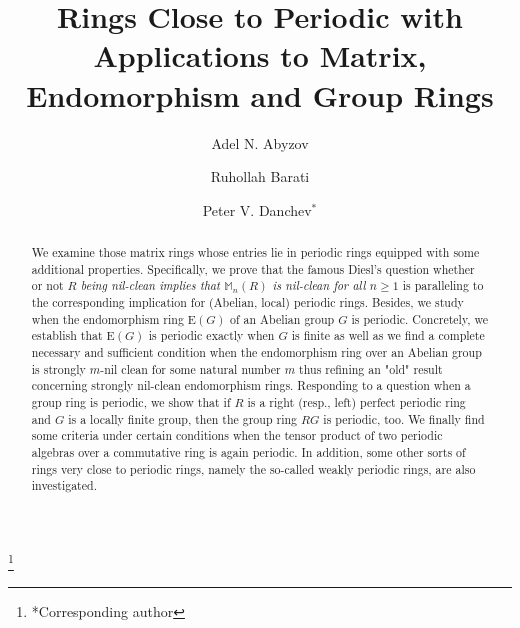 \documentclass[12pt]{amsart}
\theoremstyle{definition}
\theoremstyle{remark}
\numberwithin{equation}{section}
\begin{document}
\author[A.N. Abyzov]{Adel N. Abyzov}
\address{Department of Algebra and Mathematical Logic, Kasan Federal University, Volga Region, Russian Federation}

\author[Ruhollah Barati]{Ruhollah Barati}
\address{Department of Pure Mathematics, Faculty of Mathematical Sciences,
Tarbiat Modares University, Tehran, Iran}

\author[P.V. Danchev]{Peter V. Danchev$^*$}
\address{Institute of Mathematics and Informatics, Bulgarian Academy of Sciences, Sofia, Bulgaria}



\title{Rings Close to Periodic with Applications to Matrix, Endomorphism and Group Rings}
\thanks{*Corresponding author}

\begin{abstract} We examine those matrix rings whose entries lie in periodic rings equipped with some additional properties. Specifically, we prove that the famous Diesl's question whether or not {\it $R$ being nil-clean implies that $\mathbb{M}_n(R)$ is nil-clean for all $n\geq 1$} is paralleling to the corresponding implication for (Abelian, local) periodic rings. Besides, we study when the endomorphism ring $\mathrm{E}(G)$ of an Abelian group $G$ is periodic. Concretely, we establish that $\mathrm{E}(G)$ is periodic exactly when $G$ is finite as well as we find a complete necessary and sufficient condition when the endomorphism ring over an Abelian group is strongly $m$-nil clean for some natural number $m$ thus refining an "old" result concerning strongly nil-clean endomorphism rings. Responding to a question when a group ring is periodic, we show that if $R$ is a right (resp., left) perfect periodic ring and $G$ is a locally finite group, then the group ring $RG$ is periodic, too. We finally find some criteria under certain conditions when the tensor product of two periodic algebras over a commutative ring is again periodic. In addition, some other sorts of rings very close to periodic rings, namely the so-called weakly periodic rings, are also investigated.
\end{abstract}

\maketitle
\end{document}
